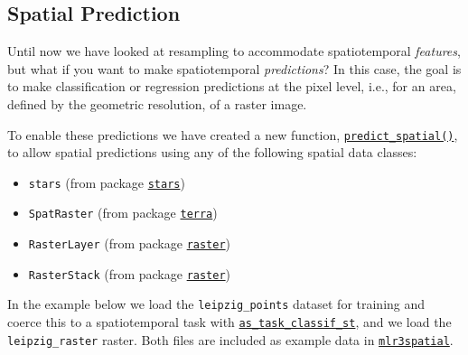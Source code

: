 \hypertarget{sec-spatial-prediction}{%
\subsection{Spatial Prediction}\label{sec-spatial-prediction}}

Until now we have looked at resampling to accommodate spatiotemporal
\emph{features}, but what if you want to make spatiotemporal
\emph{predictions}? In this case, the goal is to make classification or
regression predictions at the pixel level, i.e., for an area, defined by
the geometric resolution, of a raster image.

To enable these predictions we have created a new function,
\href{https://mlr3spatial.mlr-org.com/reference/predict_spatial.html}{\texttt{predict\_spatial()}},
to allow spatial predictions using any of the following spatial data
classes:

\begin{itemize}
\tightlist
\item
  \texttt{stars} (from package
  \href{https://cran.r-project.org/package=stars}{\texttt{stars}})
\item
  \texttt{SpatRaster} (from package
  \href{https://cran.r-project.org/package=terra}{\texttt{terra}})
\item
  \texttt{RasterLayer} (from package
  \href{https://cran.r-project.org/package=raster}{\texttt{raster}})
\item
  \texttt{RasterStack} (from package
  \href{https://cran.r-project.org/package=raster}{\texttt{raster}})
\end{itemize}

In the example below we load the \texttt{leipzig\_points} dataset for
training and coerce this to a spatiotemporal task with
\href{https://mlr3spatiotempcv.mlr-org.com/reference/as_task_classif_st.html}{\texttt{as\_task\_classif\_st}},
and we load the \texttt{leipzig\_raster} raster. Both files are included
as example data in
\href{https://mlr3spatial.mlr-org.com}{\texttt{mlr3spatial}}.

